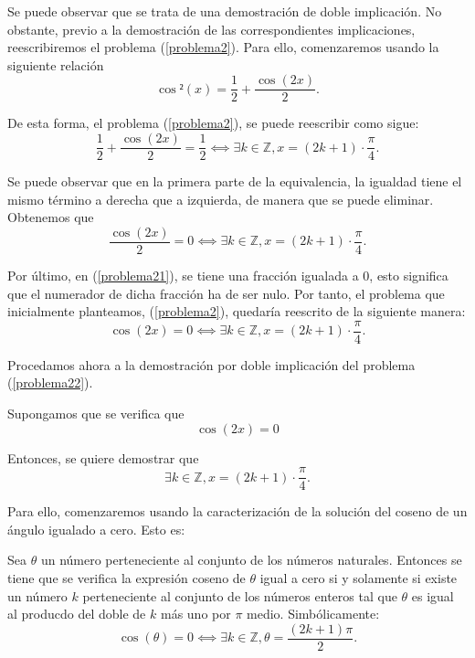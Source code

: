 \begin{demostracion}
  Se puede observar que se trata de una demostración de doble
  implicación. No obstante, previo a la demostración de las
  correspondientes implicaciones, reescribiremos el problema
  (\ref{problema2}). Para ello, comenzaremos usando la siguiente
  relación
  \begin{equation}
    \cos²(x) = \frac{1}{2} + \frac{\cos(2x)}{2}.
  \end{equation}

  De esta forma, el problema (\ref{problema2}), se puede reescribir como
  sigue:
  \begin{equation}
    \frac{1}{2} + \frac{\cos(2x)}{2} = \frac{1}{2} ⟺
    ∃ k ∈ ℤ, x = (2k + 1) ⋅ \frac{π}{4}.
  \end{equation}

  Se puede observar que en la primera parte de la equivalencia, la
  igualdad tiene el mismo término a derecha que a izquierda, de manera
  que se puede eliminar. Obtenemos que
  \begin{equation}\label{problema21}
    \frac{\cos(2x)}{2} = 0 ⟺ ∃ k ∈ ℤ, x = (2k+1) ⋅ \frac{π}{4}.
  \end{equation}

  Por último, en (\ref{problema21}), se tiene una fracción
  igualada a 0, esto significa que el numerador de dicha fracción
  ha de ser nulo. Por tanto, el problema que inicialmente
  planteamos, (\ref{problema2}), quedaría reescrito de la
  siguiente manera:
  \begin{equation}\label{problema22}
    \cos(2x) = 0  ⟺ ∃ k ∈ ℤ, x = (2k+1) ⋅ \frac{π}{4}.
  \end{equation}

  Procedamos ahora a la demostración por doble implicación del
  problema (\ref{problema22}).

  \noindent
  \framebox{\longrightarrow} Supongamos que se verifica que
  \begin{equation}\label{Dobleh2}\tag{h1}
    \cos(2x) = 0
  \end{equation}

  Entonces, se quiere demostrar que
  \begin{equation}\label{ConcDoble}
    ∃ k ∈ ℤ, x = (2k+1) ⋅ \frac{π}{4}.
  \end{equation}

  Para ello, comenzaremos usando la caracterización de la solución
  del coseno de un ángulo igualado a cero. Esto es:

  \begin{proposicion}\label{alpha}
    Sea \(θ\) un número perteneciente al conjunto de los
    números naturales. Entonces se tiene que se verifica la
    expresión coseno de \(θ \) igual a cero si y solamente si
    existe un número \(k\) perteneciente al conjunto de los
    números enteros tal que \(θ \) es igual al producdo del
    doble de \(k\) más uno por \(π \) medio. Simbólicamente:
  \begin{equation}\label{alpha2}
    \cos(θ)=0 ⟺∃ k ∈ℤ,  θ=\frac{(2k+1)π}{2}.
  \end{equation}
  \end{proposicion}


\end{demostracion}
